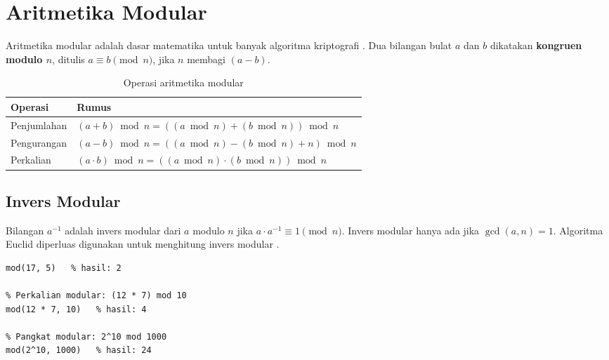 \section{Aritmetika Modular}

Aritmetika modular adalah dasar matematika untuk banyak algoritma kriptografi \cite{trappe2006,menezes1996}. Dua bilangan bulat $a$ dan $b$ dikatakan \textbf{kongruen modulo $n$}, ditulis $a \equiv b \pmod{n}$, jika $n$ membagi $(a - b)$.

\begin{table}[!htbp]
\centering
\caption{Operasi aritmetika modular}
\label{tab:aritmetika-modular}
\begin{tabular}{@{}ll@{}}
\toprule
\textbf{Operasi} & \textbf{Rumus} \\
\midrule
Penjumlahan & $(a + b) \bmod n = ((a \bmod n) + (b \bmod n)) \bmod n$ \\
Pengurangan & $(a - b) \bmod n = ((a \bmod n) - (b \bmod n) + n) \bmod n$ \\
Perkalian & $(a \cdot b) \bmod n = ((a \bmod n) \cdot (b \bmod n)) \bmod n$ \\
\bottomrule
\end{tabular}
\end{table}

\subsection{Invers Modular}
Bilangan $a^{-1}$ adalah invers modular dari $a$ modulo $n$ jika $a \cdot a^{-1} \equiv 1 \pmod{n}$. Invers modular hanya ada jika $\gcd(a, n) = 1$. Algoritma Euclid diperluas digunakan untuk menghitung invers modular \cite{trappe2006,menezes1996}.

\begin{lstlisting}[style=matlab,caption={Operasi modular dalam MATLAB}]
% Contoh: 17 mod 5 = 2
mod(17, 5)   % hasil: 2

% Perkalian modular: (12 * 7) mod 10
mod(12 * 7, 10)   % hasil: 4

% Pangkat modular: 2^10 mod 1000
mod(2^10, 1000)   % hasil: 24
\end{lstlisting}
